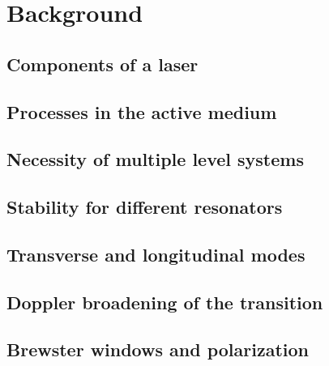 \section[Background]{Background \textnormal{\cite{Eichler_2018}}}

\subsection{Components of a laser}

\subsection{Processes in the active medium}

\subsection{Necessity of multiple level systems}

\subsection{Stability for different resonators}

\subsection{Transverse and longitudinal modes}

\subsection{Doppler broadening of the transition}

\subsection{Brewster windows and polarization}
